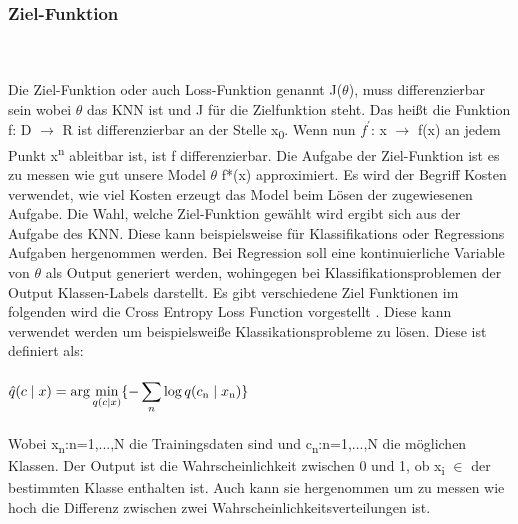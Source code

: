 \documentclass{llncs}
\begin{document}
\newpage
\subsubsection{Ziel-Funktion}\label{sec:Zielfunktion}
~\\\\
Die Ziel-Funktion oder auch Loss-Funktion genannt J($\theta$), muss differenzierbar sein wobei $\theta$ das KNN ist und J für die Zielfunktion steht. Das heißt die Funktion f: D $\to$ R ist differenzierbar an der Stelle x\textsubscript{0}. Wenn nun $f^\prime$: x $\to$ f(x) an jedem Punkt x\textsuperscript{n} ableitbar ist, ist f differenzierbar. Die Aufgabe der Ziel-Funktion ist es zu messen wie gut unsere Model $\theta$ f*(x) approximiert. Es wird der Begriff Kosten verwendet, wie viel Kosten erzeugt das Model beim Lösen der zugewiesenen Aufgabe. Die Wahl, welche Ziel-Funktion gewählt wird ergibt sich aus der Aufgabe des KNN. Diese kann beispielsweise für Klassifikations oder Regressions Aufgaben hergenommen werden. Bei Regression soll eine kontinuierliche Variable von $\theta$ als Output generiert werden, wohingegen bei Klassifikationsproblemen der Output Klassen-Labels darstellt\cite{Grundlagen}. Es gibt verschiedene Ziel Funktionen im folgenden wird die Cross Entropy Loss Function vorgestellt \cite{crossentropy}. Diese kann verwendet werden um beispielsweiße Klassikationsprobleme zu lösen. Diese ist definiert als:
\\\\
\begin{math}
\hat{q}(c\mid x)=\displaystyle\arg\min_{q(c\mid  x)}\{-\displaystyle\sum_{n}{\log q(c\textsubscript{n}\mid x\textsubscript{n})}\}
\end{math}
\\\\
Wobei  x\textsubscript{n}:n=1,...,N die Trainingsdaten sind und c\textsubscript{n}:n=1,...,N die möglichen Klassen. Der Output ist die Wahrscheinlichkeit zwischen 0 und 1, ob  x\textsubscript{i} $\in$ der bestimmten Klasse enthalten ist. Auch kann sie hergenommen um zu messen wie hoch die Differenz zwischen zwei Wahrscheinlichkeitsverteilungen ist.
\end{document}
